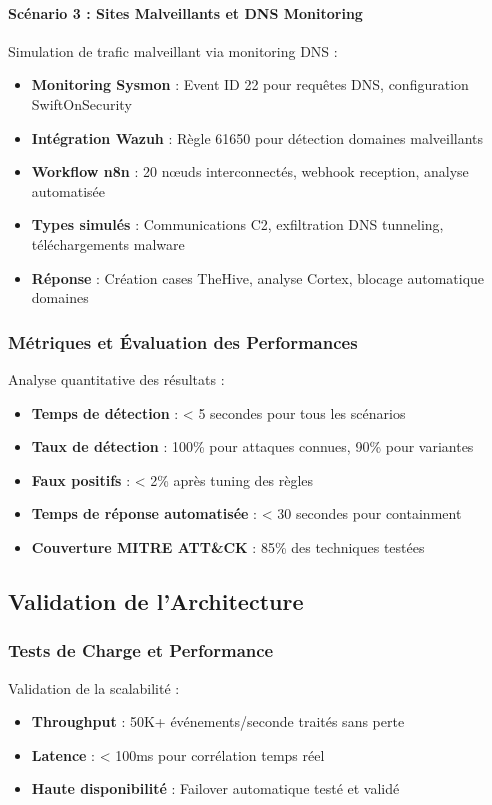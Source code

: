 \paragraph{Scénario 3 : Sites Malveillants et DNS Monitoring}
Simulation de trafic malveillant via monitoring DNS :
\begin{itemize}
    \item \textbf{Monitoring Sysmon} : Event ID 22 pour requêtes DNS, configuration SwiftOnSecurity
    \item \textbf{Intégration Wazuh} : Règle 61650 pour détection domaines malveillants
    \item \textbf{Workflow n8n} : 20 nœuds interconnectés, webhook reception, analyse automatisée
    \item \textbf{Types simulés} : Communications C2, exfiltration DNS tunneling, téléchargements malware
    \item \textbf{Réponse} : Création cases TheHive, analyse Cortex, blocage automatique domaines
\end{itemize}

\subsubsection{Métriques et Évaluation des Performances}
Analyse quantitative des résultats :
\begin{itemize}
    \item \textbf{Temps de détection} : < 5 secondes pour tous les scénarios
    \item \textbf{Taux de détection} : 100\% pour attaques connues, 90\% pour variantes
    \item \textbf{Faux positifs} : < 2\% après tuning des règles
    \item \textbf{Temps de réponse automatisée} : < 30 secondes pour containment
    \item \textbf{Couverture MITRE ATT\&CK} : 85\% des techniques testées
\end{itemize}

\subsection{Validation de l'Architecture}

\subsubsection{Tests de Charge et Performance}
Validation de la scalabilité :
\begin{itemize}
    \item \textbf{Throughput} : 50K+ événements/seconde traités sans perte
    \item \textbf{Latence} : < 100ms pour corrélation temps réel
    \item \textbf{Haute disponibilité} : Failover automatique testé et validé
\end{itemize}


